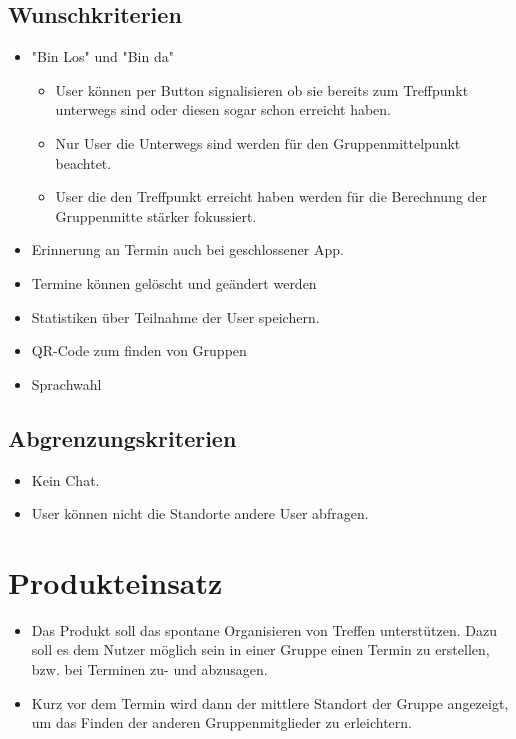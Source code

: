 \documentclass{scrartcl}
\begin{document}
	\subsection{Wunschkriterien}
		\begin{itemize}
		\item "Bin Los" und "Bin da"
			\begin{itemize}
			\item User können per Button signalisieren ob sie bereits zum Treffpunkt unterwegs sind oder diesen sogar schon erreicht haben.
			\item Nur User die Unterwegs sind werden für den Gruppenmittelpunkt beachtet.
			\item User die den Treffpunkt erreicht haben werden für die Berechnung der Gruppenmitte stärker fokussiert.
			\end{itemize}
		\item Erinnerung an Termin auch bei geschlossener App.
		\item Termine können gelöscht und geändert werden
		\item Statistiken über Teilnahme der User speichern.
		\item QR-Code zum finden von Gruppen
		\item Sprachwahl
		\end{itemize}
	\subsection{Abgrenzungskriterien}
		\begin{itemize}
		\item Kein Chat.
		\item User können nicht die Standorte andere User abfragen.
		\end{itemize}

	\newpage

	

	\section{Produkteinsatz}
	\begin{itemize}	        
		\item Das Produkt soll das spontane Organisieren von Treffen unterstützen. Dazu soll es dem Nutzer möglich sein in einer Gruppe einen Termin zu erstellen, bzw. bei Terminen zu- und abzusagen.
		\item Kurz vor dem Termin wird dann der mittlere Standort der Gruppe angezeigt, um das Finden der anderen Gruppenmitglieder zu erleichtern.
		\end{itemize}
\end{document}
